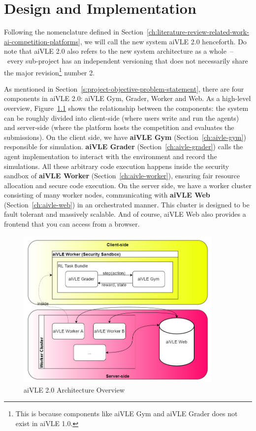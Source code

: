 \chapter{Design and Implementation}
\label{ch:design-and-impl}
Following the nomenclature defined in Section~\ref{ch:literature-review-related-work-ai-competition-platforms}, we will call the new system aiVLE 2.0 henceforth. Do note that aiVLE 2.0 also refers to the new system architecture as a whole~–~every sub-project has an independent versioning that does not necessarily share the major revision\footnote{This is because components like aiVLE Gym and aiVLE Grader does not exist in aiVLE 1.0.} number 2. 

As mentioned in Section~\ref{s:project-objective-problem-statement}, there are four components in aiVLE 2.0: aiVLE Gym, Grader, Worker and Web. As a high-level overview, Figure~\ref{fig:architecture-overview} shows the relationship between the components: the system can be roughly divided into client-side (where users write and run the agents) and server-side (where the platform hosts the competition and evaluates the submissions). On the client side, we have \textbf{aiVLE Gym} (Section~\ref{ch:aivle-gym}) responsible for simulation. \textbf{aiVLE Grader} (Section~\ref{ch:aivle-grader}) calls the agent implementation to interact with the environment and record the simulations. All these arbitrary code execution happens inside the security sandbox of \textbf{aiVLE Worker} (Section~\ref{ch:aivle-worker}), ensuring fair resource allocation and secure code execution. On the server side, we have a worker cluster consisting of many worker nodes, communicating with \textbf{aiVLE Web} (Section~\ref{ch:aivle-web}) in an orchestrated manner. This cluster is designed to be fault tolerant and massively scalable. And of course, aiVLE Web also provides a frontend that you can access from a browser.

\begin{figure}[H]
    \centering
    \includegraphics[width=0.9\textwidth]{images/architecture-overview.png}
    \caption{aiVLE 2.0 Architecture Overview}
    \label{fig:architecture-overview}
\end{figure}

